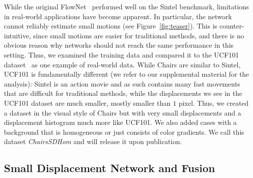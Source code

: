 \documentclass[10pt,twocolumn,letterpaper]{article}%
\newcommand{\chairsSD}{\mbox{ChairsSDHom}\xspace}
\newcommand{\chairs}{\mbox{Chairs}\xspace}
\newcommand{\things}{\mbox{Things3D}\xspace}
\begin{document}
While the original FlowNet~\cite{DFIB15} performed well on the Sintel benchmark, limitations in real-world applications have become apparent.
In particular, the network cannot reliably estimate small motions (see Figure~\ref{fig:teaser}). This is counter-intuitive, since small motions are easier for traditional methods, and there is no obvious reason why networks should not reach the same performance in this setting. Thus, we examined the training data and compared it to the UCF101 dataset~\cite{ucf101} as one example of real-world data.
While \chairs are similar to Sintel,
UCF101 is fundamentally different (we refer to our supplemental material for the analysis): Sintel
is an action movie and as such contains many fast movements that are difficult for traditional methods, while the displacements we see in the UCF101 dataset are much smaller, mostly smaller than $1$ pixel. Thus, we created a dataset in the visual style of \chairs but with very small displacements and a displacement histogram much more like UCF101. %
We also added cases with a background that is homogeneous or just consists of color gradients. 
We call this dataset \textit{\chairsSD} and will release it upon publication. 

\subsection{Small Displacement Network and Fusion}
\end{document}

